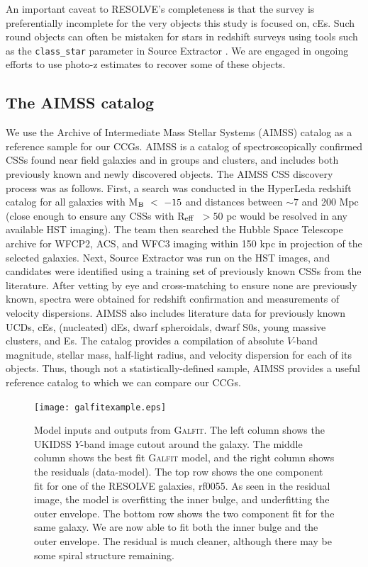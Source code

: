 \documentclass[iop,apj]{emulateapj}
\newcommand{\Reff}{R$_{\rm eff}$}
\begin{document}
An important caveat to RESOLVE's completeness is that the survey is preferentially incomplete for the very objects this study is focused on, cEs. Such round objects can often be mistaken for stars in redshift surveys using tools such as the \texttt{class\_star} parameter in Source Extractor \citep{Bertin1996}. We are engaged in ongoing efforts to use photo-z estimates to recover some of these objects.

\subsection{The AIMSS catalog}
\label{aimss}

\noindent We use the Archive of Intermediate Mass Stellar Systems (AIMSS) catalog \citep{Norris2014,Forbes2014,Janz2015} as a reference sample for our CCGs.  AIMSS is a catalog of spectroscopically confirmed CSSs found near field galaxies and in groups and clusters, and includes both previously known and newly discovered objects. The AIMSS CSS discovery process was as follows. First, a search was conducted in the HyperLeda redshift catalog \citep{Paturel2003} for all galaxies with M$_{\rm B}~<~-15$ and distances between $\sim 7$ and 200 Mpc (close enough to ensure any CSSs with \Reff\ $> 50$ pc would be resolved in any available HST imaging). The team then searched the Hubble Space Telescope archive for WFCP2, ACS, and WFC3 imaging within 150 kpc in projection of the selected galaxies. Next, Source Extractor was run on the HST images, and candidates were identified using a training set of previously known CSSs from the literature. After vetting by eye and cross-matching to ensure none are previously known, spectra were obtained for redshift confirmation and measurements of velocity dispersions. AIMSS also includes literature data for previously known UCDs, cEs, (nucleated) dEs, dwarf spheroidals, dwarf S0s, young massive clusters, and Es. The catalog provides a compilation of absolute $V$-band magnitude, stellar mass, half-light radius, and velocity dispersion for each of its objects. Thus, though not a statistically-defined sample, AIMSS provides a useful reference catalog to which we can compare our CCGs.

\begin{figure}[b]
\begin{center}
\texttt{[image: galfitexample.eps]}
\caption{Model inputs and outputs from \textsc{Galfit}. The left column shows the UKIDSS $Y$-band image cutout around the galaxy. The middle column shows the best fit \textsc{Galfit} model, and the right column shows the residuals (data-model). The top row shows the one component fit for one of the RESOLVE galaxies, rf0055. As seen in the residual image, the model is overfitting the inner bulge, and underfitting the outer envelope. The bottom row shows the two component fit for the same galaxy. We are now  able to fit both the inner bulge and the outer envelope. The residual is much cleaner, although there may be some spiral structure remaining.}
\label{fig:galfit}
\end{center}
\end{figure}
\end{document}
